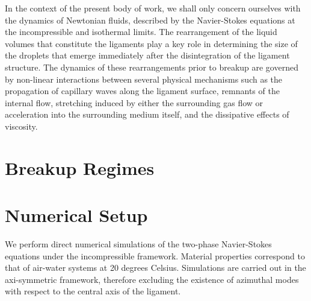 
In the context of the present body of work, we shall 
only concern ourselves with the dynamics of Newtonian fluids, 
described by the Navier-Stokes equations at the incompressible
and isothermal limits. 
The rearrangement of the liquid volumes that constitute
the ligaments play a key role in determining the size 
of the droplets that emerge immediately after the disintegration
of the ligament structure.  
The dynamics of these rearrangements prior to breakup are 
governed by non-linear interactions between several 
physical mechanisms such as the propagation of capillary waves
along the ligament surface, remnants of the internal flow, 
stretching induced by either the surrounding 
gas flow or acceleration into the surrounding medium itself,
and the dissipative effects of viscosity.  


%
%



\section{Breakup Regimes}



\section{Numerical Setup}
We perform direct numerical simulations of the two-phase 
Navier-Stokes equations under the incompressible framework. 
Material properties correspond to that of air-water systems at 20 degrees Celsius. 
Simulations are carried out in the axi-symmetric framework, 
therefore excluding the existence of azimuthal modes with 
respect to the central axis of the ligament. 

